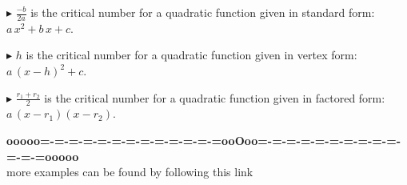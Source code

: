 \documentclass{ximera}
\begin{document}
\textbf{\textcolor{blue!55!black}{$\blacktriangleright$}}  $\frac{-b}{2a}$ is the critical number for a quadratic function given in standard form: $a \, x^2 + b \, x + c$.



\textbf{\textcolor{blue!55!black}{$\blacktriangleright$}}  $h$ is the critical number for a quadratic function given in vertex form: $a \, (x - h)^2 + c$.



\textbf{\textcolor{blue!55!black}{$\blacktriangleright$}}  $\frac{r_1 + r_2}{2}$ is the critical number for a quadratic function given in factored form: $a \, (x - r_1) (x - r_2)$.







\begin{center}
\textbf{\textcolor{green!50!black}{ooooo=-=-=-=-=-=-=-=-=-=-=-=-=ooOoo=-=-=-=-=-=-=-=-=-=-=-=-=ooooo}} \\

more examples can be found by following this link\\ 

\end{center}
\end{document}
